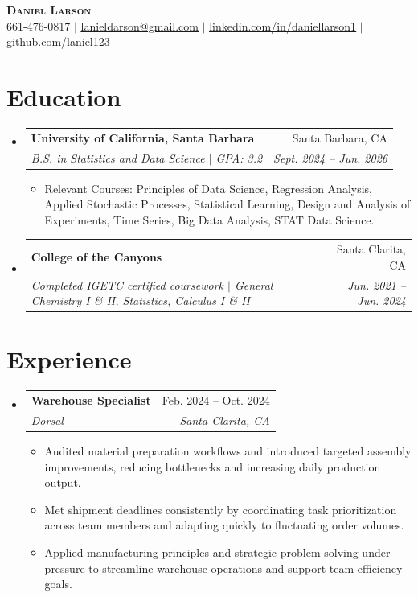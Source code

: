 \documentclass[letterpaper,11pt]{article}
\makeatletter
\newcommand{\resumeItem}[1]{
  \item\small{
    {#1 \vspace{-2pt}}
  }
}
\newcommand{\resumeSubheading}[4]{
  \vspace{-2pt}\item
    \begin{tabular*}{0.97\textwidth}[t]{l@{\extracolsep{\fill}}r}
      \textbf{#1} & #2 \\
      \textit{\small#3} & \textit{\small #4} \\
    \end{tabular*}\vspace{-7pt}
}
\newcommand{\resumeSubHeadingListStart}{\begin{itemize}[leftmargin=0.15in, label={}]}
\newcommand{\resumeSubHeadingListEnd}{\end{itemize}}
\newcommand{\resumeItemListStart}{\begin{itemize}}
\newcommand{\resumeItemListEnd}{\end{itemize}\vspace{-5pt}}
\makeatother
\begin{document}
 
\begin{center}
    \textbf{\fontsize{16}{18}\selectfont \scshape Daniel Larson} \\ \vspace{1pt}
    \small 661-476-0817 $|$ \href{mailto:lanieldarson@gmail.com}{\underline{lanieldarson@gmail.com}} $|$
    \href{https://www.linkedin.com/in/daniellarson1}{\underline{linkedin.com/in/daniellarson1}} $|$
    \href{https://github.com/laniel123}{\underline{github.com/laniel123}}
\end{center}
 
\section{Education}
  \resumeSubHeadingListStart
    \resumeSubheading
      {University of California, Santa Barbara}{Santa Barbara, CA}
      {B.S. in Statistics and Data Science $|$ GPA: 3.2}{Sept. 2024 -- Jun. 2026}
      \resumeItemListStart
        \resumeItem{Relevant Courses: Principles of Data Science, Regression Analysis, 
        Applied Stochastic Processes, Statistical Learning, Design and Analysis of Experiments, 
        Time Series, Big Data Analysis, STAT Data Science.}
      \resumeItemListEnd
      \resumeSubheading
      {College of the Canyons}{Santa Clarita, CA}
      {Completed IGETC certified coursework $|$ General Chemistry I \& II, Statistics, Calculus I \& II}{Jun. 2021 -- Jun. 2024}
      \resumeSubHeadingListEnd
      
\section{Experience}
  \resumeSubHeadingListStart
    \resumeSubheading
      {Warehouse Specialist}{Feb. 2024 -- Oct. 2024}
      {Dorsal}{Santa Clarita, CA}
      \resumeItemListStart
        \resumeItem{Audited material preparation workflows and introduced targeted assembly improvements, reducing bottlenecks and increasing daily production output.}
        \resumeItem{Met shipment deadlines consistently by coordinating task prioritization across team members and adapting quickly to fluctuating order volumes.}
        \resumeItem{Applied manufacturing principles and strategic problem-solving under pressure to streamline warehouse operations and support team efficiency goals.}
      \resumeItemListEnd
  \resumeSubHeadingListEnd

\end{document}
